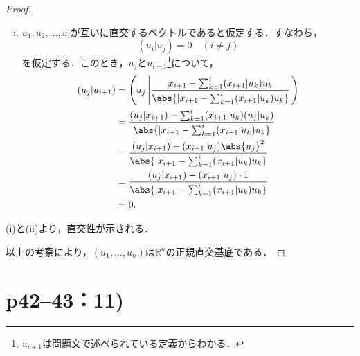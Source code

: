 \documentclass[a4paper,10pt,fleqn]{ltjsarticle}
\begin{document}
\begin{tleftbar}
\begin{proof}
\begin{description}
\begin{enumerate}[(i)]
                      \item $u_1, u_2, \ldots, u_i$が互いに直交するベクトルであると仮定する．すなわち，
                            \[
                                (u_i | u_j) = 0 \quad (i \ne j)
                            \]
                            を仮定する．このとき，$u_j$と$u_{i+1}$\footnote{$u_{i+1}$は問題文で述べられている定義からわかる．}について，
                            \begin{align*}
                                (u_j | u_{i+1}) & =\left  ( u_j \left| \frac{x_{i+1} - \sum_{k=1}^{i} (x_{i+1} | u_k) u_k}{\abs{| x_{i+1} - \sum_{k=1}^{i} (x_{i+1} | u_k) u_k }} \right. \right) \\
                                                & = \frac{(u_j | x_{i+1}) - \sum_{k=1}^{i} (x_{i+1} | u_k) (u_j | u_k)}{\abs{| x_{i+1} - \sum_{k=1}^{i} (x_{i+1} | u_k) u_k }}                    \\
                                                & = \frac{(u_j | x_{i+1}) - (x_{i+1} | u_j) \abs{u_j}^2}{\abs{| x_{i+1} - \sum_{k=1}^{i} (x_{i+1} | u_k) u_k }}                                   \\
                                                & = \frac{(u_j | x_{i+1}) - (x_{i+1} | u_j) \cdot 1}{\abs{| x_{i+1} - \sum_{k=1}^{i} (x_{i+1} | u_k) u_k }}                                       \\
                                                & = 0.
                            \end{align*}
                  \end{enumerate}
                  (i)と(ii)より，直交性が示される．
        \end{description}
        以上の考察により，$(u_1, \ldots, u_n)$は$\mathbb{R}^n$の正規直交基底である．
    \end{proof}
\end{tleftbar}

\newpage

\section*{p42--43：11)}
\end{document}
